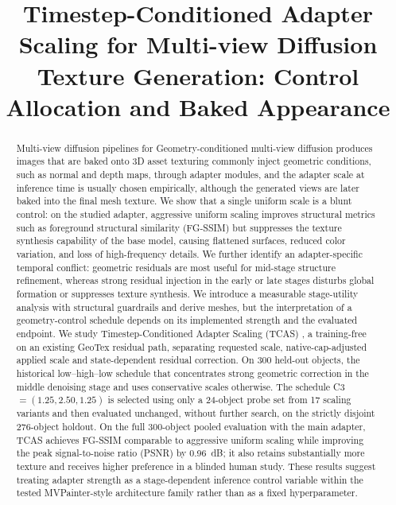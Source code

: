 \documentclass[times,twocolumn,final]{elsarticle}
\providecommand{\DIFadd}[1]{{\protect\color{blue} \sf #1}} %
\providecommand{\DIFdel}[1]{{\protect\color{red} \scriptsize #1}} %
\providecommand{\DIFaddbegin}{} %
\providecommand{\DIFaddend}{} %
\providecommand{\DIFdelbegin}{} %
\providecommand{\DIFdelend}{} %
\begin{document}
\begin{frontmatter}

\DIFdelbegin %
\DIFdelend \DIFaddbegin \title{Timestep-Conditioned Adapter Scaling for Multi-view Diffusion Texture Generation: Control Allocation and Baked Appearance}
\DIFaddend 


\begin{abstract}
\DIFdelbegin \DIFdel{Multi-view diffusion pipelines for }\DIFdelend \DIFaddbegin \DIFadd{Geometry-conditioned multi-view diffusion produces images that are baked onto }\DIFaddend 3D \DIFdelbegin \DIFdel{asset texturing commonly inject geometric conditions, such as normal and depth maps, through adapter modules, and the adapter scale at inference time is usually chosen empirically, although the generated views are later baked into the final mesh texture. We show that a single uniform scale is a blunt control: on the studied adapter, aggressive uniform scaling improves structural metrics such as foreground structural similarity (FG-SSIM) but suppresses the texture synthesis capability of the base model, causing flattened surfaces, reduced color variation, and loss of high-frequency details. We further identify an adapter-specific temporal conflict: geometric residuals are most useful for mid-stage structure refinement, whereas strong residual injection in the early or late stages disturbs global formation or suppresses texture synthesis. We introduce a measurable stage-utility analysis with structural guardrails and derive }\DIFdelend \DIFaddbegin \DIFadd{meshes, but the interpretation of a geometry-control schedule depends on its implemented strength and the evaluated endpoint. We study }\DIFaddend Timestep-Conditioned Adapter Scaling (TCAS) \DIFdelbegin \DIFdel{, a training-free }\DIFdelend \DIFaddbegin \DIFadd{on an existing GeoTex residual path, separating requested scale, native-cap-adjusted applied scale and state-dependent residual correction. On 300 held-out objects, the historical }\DIFaddend low--high--low \DIFdelbegin \DIFdel{schedule that concentrates strong geometric correction in the middle denoising stage and uses conservative scales otherwise. The schedule }\DIFdelend C3 \DIFdelbegin \DIFdel{$=(1.25, 2.50, 1.25)$ is selected using only a 24-object probe set from 17 scaling variants and then evaluated unchanged, without further search, on the strictly disjoint 276-object holdout. On the full 300-object pooled evaluation with the main adapter, TCAS achieves FG-SSIM comparable to aggressive uniform scaling while improving the peak signal-to-noise ratio (PSNR) by 0.96~dB; it also retains substantially more texture and receives higher preference in a blinded human study. These results suggest treating adapter strength as a stage-dependent inference control variable within the tested MVPainter-style architecture family rather than as a fixed hyperparameter.
}
\end{abstract}
\end{frontmatter}
\end{document}
